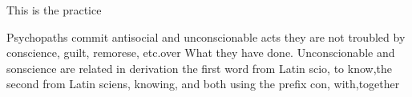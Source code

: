 \documentclass{article}
\begin{document}
This is the practice
\begin{minipage}{3cm}
Psychopaths commit antisocial and unconscionable acts  they are not
troubled by conscience, guilt, remorese, etc.over What they have done.
Unconscionable and sonscience are related in derivation  the first word
from Latin scio, to know,the second from Latin sciens, knowing, and both using the prefix con, with,together
\end{minipage}
\end{document}
